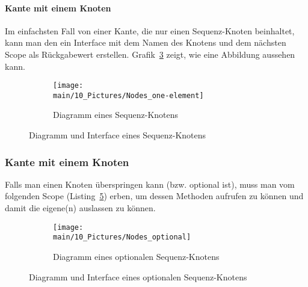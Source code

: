 \documentclass[../InterneDSLs.tex]{subfiles}
\begin{document}
\paragraph{Kante mit einem Knoten}
Im einfachsten Fall von einer Kante, die nur einen Sequenz-Knoten beinhaltet, kann man den ein Interface mit dem Namen des Knotens und dem nächsten Scope als Rückgabewert erstellen. Grafik~\ref{FIG:OneElementNode} zeigt, wie eine Abbildung aussehen kann.
\begin{figure}[ht]
\centering
  \begin{subfigure}[c]{0.49\textwidth}
    \texttt{[image: \\main/10\_Pictures/Nodes\_one-element]}
    \caption{Diagramm eines Sequenz-Knotens}
    \label{FIG:DiagramOneElementNode}
  \end{subfigure}
  \begin{subfigure}[c]{0.49\textwidth}
    
    \label{FIG:JInterfaceOneElementNode}
  \end{subfigure}
  \caption{Diagramm und Interface eines Sequenz-Knotens}
  \label{FIG:OneElementNode}
\end{figure}

\subsubsection{Kante mit einem Knoten}
Falls man einen Knoten überspringen kann (bzw. optional ist), muss man vom folgenden Scope (Listing~\ref{FIG:JInterfaceOptionalNode}) erben, um dessen Methoden aufrufen zu können und damit die eigene(n) auslassen zu können.
\begin{figure}[ht]
\centering
  \begin{subfigure}[c]{0.49\textwidth}
    \texttt{[image: \\main/10\_Pictures/Nodes\_optional]}
    \caption{Diagramm eines optionalen Sequenz-Knotens}
    \label{FIG:DiagramOptionalNode}
  \end{subfigure}
  \begin{subfigure}[c]{0.49\textwidth}
    
    \label{FIG:JInterfaceOptionalNode}
  \end{subfigure}
  \caption{Diagramm und Interface eines optionalen Sequenz-Knotens}
  \label{FIG:OptionalNode}
\end{figure}
\end{document}
